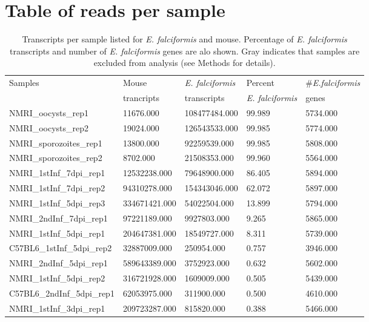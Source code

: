 \documentclass{article}
\begin{document}
\section{Table of reads per sample}
\setlength{\tabcolsep}{10pt}
\begin{table}[H]
\centering 
\caption{Transcripts per sample listed for \textit{E. falciformis} and mouse. Percentage of
	\textit{E. falciformis} transcripts and number of \textit{E. falciformis} genes are alo shown. 
	Gray indicates that samples are excluded from analysis (see Methods for details).}
\begin{tabular}{*5l}    \toprule
Samples  & Mouse 	& \textit{E. falciformis}  & Percent			& \#\textit{E.falciformis} \\
	& trancripts	& transcripts   	 & \textit{E. falciformis}	& genes \\ \midrule
NMRI\_oocysts\_rep1 & 11676.000 & 108477484.000 & 99.989 & 5734.000 \\ 
NMRI\_oocysts\_rep2 & 19024.000 & 126543533.000 & 99.985 & 5774.000 \\ 
NMRI\_sporozoites\_rep1 & 13800.000 & 92259539.000 & 99.985 & 5808.000 \\ 
NMRI\_sporozoites\_rep2 & 8702.000 & 21508353.000 & 99.960 & 5564.000 \\ 
NMRI\_1stInf\_7dpi\_rep1 & 12532238.000 & 79648900.000 & 86.405 & 5894.000 \\ 
NMRI\_1stInf\_7dpi\_rep2 & 94310278.000 & 154343046.000 & 62.072 & 5897.000 \\ 
NMRI\_1stInf\_5dpi\_rep3 & 334671421.000 & 54022504.000 & 13.899 & 5794.000 \\ 
NMRI\_2ndInf\_7dpi\_rep1 & 97221189.000 & 9927803.000 & 9.265 & 5865.000 \\ 
NMRI\_1stInf\_5dpi\_rep1 & 204647381.000 & 18549727.000 & 8.311 & 5739.000 \\ 
C57BL6\_1stInf\_5dpi\_rep2 & 32887009.000 & 250954.000 & 0.757 & 3946.000 \\ 
	{\color{Gray}NMRI\_2ndInf\_5dpi\_rep1} & {\color{Gray} 589643389.000} & {\color{Gray}3752923.000} & {\color{Gray} 0.632} &  {\color{Gray}5602.000} \\ 
NMRI\_1stInf\_5dpi\_rep2 & 316721928.000 & 1609009.000 & 0.505 & 5439.000 \\ 
C57BL6\_2ndInf\_5dpi\_rep1 & 62053975.000 & 311900.000 & 0.500 & 4610.000 \\ 
	{\color{Gray}NMRI\_1stInf\_3dpi\_rep1} & {\color{Gray}209723287.000} &  {\color{Gray}815820.000} &  {\color{Gray}0.388} &  {\color{Gray}5466.000} \\ 

\end{tabular}
\end{table}
\end{document}
